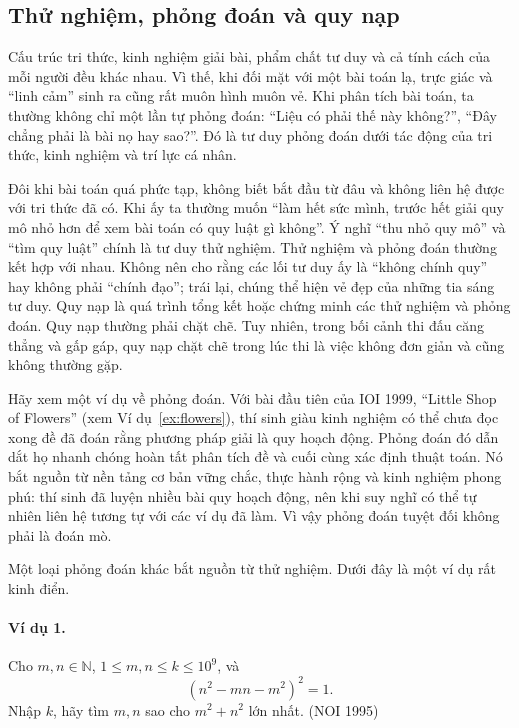 \documentclass[11pt]{article}
\begin{document}
\subsection{Thử nghiệm, phỏng đoán và quy nạp}

Cấu trúc tri thức, kinh nghiệm giải bài, phẩm chất tư duy và cả tính cách của
mỗi người đều khác nhau. Vì thế, khi đối mặt với một bài toán lạ, trực giác và
``linh cảm'' sinh ra cũng rất muôn hình muôn vẻ. Khi phân tích bài toán, ta
thường không chỉ một lần tự phỏng đoán: ``Liệu có phải thế này không?'',
``Đây chẳng phải là bài nọ hay sao?''. Đó là tư duy phỏng đoán dưới tác động
của tri thức, kinh nghiệm và trí lực cá nhân.

Đôi khi bài toán quá phức tạp, không biết bắt đầu từ đâu và không liên hệ được
với tri thức đã có. Khi ấy ta thường muốn ``làm hết sức mình, trước hết giải
quy mô nhỏ hơn để xem bài toán có quy luật gì không''. Ý nghĩ ``thu nhỏ quy
mô'' và ``tìm quy luật'' chính là tư duy thử nghiệm. Thử nghiệm và phỏng đoán
thường kết hợp với nhau. Không nên cho rằng các lối tư duy ấy là ``không chính
quy'' hay không phải ``chính đạo''; trái lại, chúng thể hiện vẻ đẹp của những
tia sáng tư duy. Quy nạp là quá trình tổng kết hoặc chứng minh các thử nghiệm
và phỏng đoán. Quy nạp thường phải chặt chẽ. Tuy nhiên, trong bối cảnh thi đấu
căng thẳng và gấp gáp, quy nạp chặt chẽ trong lúc thi là việc không đơn giản
và cũng không thường gặp.

Hãy xem một ví dụ về phỏng đoán. Với bài đầu tiên của IOI 1999, ``Little Shop
of Flowers'' (xem Ví dụ~\ref{ex:flowers}), thí sinh giàu kinh nghiệm có thể
chưa đọc xong đề đã đoán rằng phương pháp giải là quy hoạch động. Phỏng đoán
đó dẫn dắt họ nhanh chóng hoàn tất phân tích đề và cuối cùng xác định thuật
toán. Nó bắt nguồn từ nền tảng cơ bản vững chắc, thực hành rộng và kinh nghiệm
phong phú: thí sinh đã luyện nhiều bài quy hoạch động, nên khi suy nghĩ có thể
tự nhiên liên hệ tương tự với các ví dụ đã làm. Vì vậy phỏng đoán tuyệt đối
không phải là đoán mò.

Một loại phỏng đoán khác bắt nguồn từ thử nghiệm. Dưới đây là một ví dụ rất
kinh điển.

\paragraph{Ví dụ 1.}
Cho \(m,n\in\mathbb{N}\), \(1\le m,n\le k\le 10^9\), và
\[
  (n^2-mn-m^2)^2=1.
\]
Nhập \(k\), hãy tìm \(m,n\) sao cho \(m^2+n^2\) lớn nhất. (NOI 1995)
\end{document}
